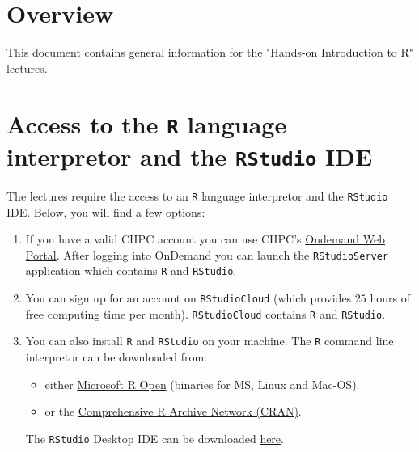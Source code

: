 \section*{Overview}

This document contains general information for the "Hands-on Introduction to R" lectures.\newline

\section{Access to the \texttt{R} language interpretor and the \texttt{RStudio} IDE}

The lectures require the access to an \texttt{R} language interpretor and the \texttt{RStudio} IDE.\newline
Below, you will find a few options:

\begin{enumerate}
\item If you have a valid CHPC account you can use CHPC's \href{http://ondemand.chpc.utah.edu/}{Ondemand Web Portal}.\newline
      After logging into OnDemand you can launch the \texttt{RStudioServer} application which contains \texttt{R} and \texttt{RStudio}.

\item You can sign up for an account on \texttt{RStudioCloud} (which provides $25$ hours of free computing time per month).\newline
      \texttt{RStudioCloud} contains \texttt{R} and \texttt{RStudio}. 

\item You can also install \texttt{R} and \texttt{RStudio} on your machine.\newline
      The \texttt{R} command line interpretor can be downloaded from:
      \begin{itemize}
	      \item either \href{https://mran.microsoft.com/}{Microsoft R Open} (binaries for MS, Linux and Mac-OS).
  	 \item or the \href{https://cran.r-project.org/}{Comprehensive R Archive Network (CRAN)}.
      \end{itemize}			

      The \texttt{RStudio} Desktop IDE can be downloaded \href{https://www.rstudio.com/products/rstudio/download/}{here}.

\end{enumerate}

